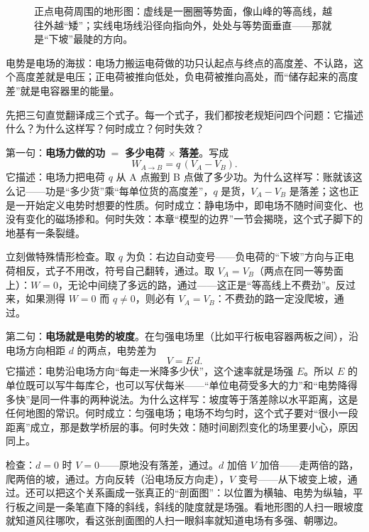 \begin{figure}[htbp]
\centering
{}
\caption{正点电荷周围的地形图：虚线是一圈圈等势面，像山峰的等高线，越往外越“矮”；实线电场线沿径向指向外，处处与等势面垂直——那就是“下坡”最陡的方向。}
\end{figure}


\begin{oneline}
电势是电场的海拔：电场力搬运电荷做的功只认起点与终点的高度差、不认路，这个高度差就是电压；正电荷被推向低处，负电荷被推向高处，而“储存起来的高度差”就是电容器里的能量。
\end{oneline}


\begin{mainline}
先把三句直觉翻译成三个式子。每一个式子，我们都按老规矩问四个问题：它描述什么？为什么这样写？何时成立？何时失效？

第一句：\textbf{电场力做的功} \(=\) \textbf{多少电荷} \(\times\) \textbf{落差}。写成
\[
W_{A\to B} = q\,(V_A - V_B) .
\]
它描述：电场力把电荷 \(q\) 从 A 点搬到 B 点做了多少功。为什么这样写：账就该这么记——功是“多少货”乘“每单位货的高度差”，\(q\) 是货，\(V_A - V_B\) 是落差；这也正是一开始定义电势时想要的性质。何时成立：静电场中，即电场不随时间变化、也没有变化的磁场掺和。何时失效：本章“模型的边界”一节会揭晓，这个式子脚下的地基有一条裂缝。

立刻做特殊情形检查。取 \(q\) 为负：右边自动变号——负电荷的“下坡”方向与正电荷相反，式子不用改，符号自己翻转，通过。取 \(V_A = V_B\)（两点在同一等势面上）：\(W=0\)，无论中间绕了多远的路，通过——这正是“等高线上不费劲”。反过来，如果测得 \(W=0\) 而 \(q\neq 0\)，则必有 \(V_A = V_B\)：不费劲的路一定没爬坡，通过。

第二句：\textbf{电场就是电势的坡度}。在匀强电场里（比如平行板电容器两板之间），沿电场方向相距 \(d\) 的两点，电势差为
\[
V = E\,d .
\]
它描述：电势沿电场方向“每走一米降多少伏”，这个速率就是场强 \(E\)。所以 \(E\) 的单位既可以写牛每库仑，也可以写伏每米——“单位电荷受多大的力”和“电势降得多快”是同一件事的两种说法。为什么这样写：坡度等于落差除以水平距离，这是任何地图的常识。何时成立：匀强电场；电场不均匀时，这个式子要对“很小一段距离”成立，那是数学桥层的事。何时失效：随时间剧烈变化的场里要小心，原因同上。

检查：\(d=0\) 时 \(V=0\)——原地没有落差，通过。\(d\) 加倍 \(V\) 加倍——走两倍的路，爬两倍的坡，通过。方向反转（沿电场反方向走），\(V\) 变号——从下坡变上坡，通过。还可以把这个关系画成一张真正的“剖面图”：以位置为横轴、电势为纵轴，平行板之间是一条笔直下降的斜线，斜线的陡度就是场强。看地形图的人扫一眼坡度就知道风往哪吹，看这张剖面图的人扫一眼斜率就知道电场有多强、朝哪边。
\end{mainline}

